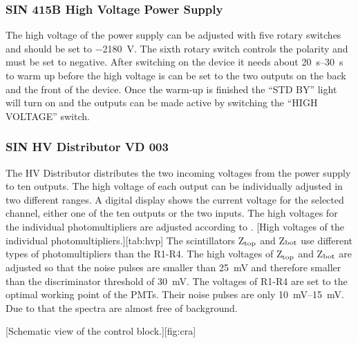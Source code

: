 \subsubsection*{SIN 415B High Voltage Power Supply}
The high voltage of the power supply can be adjusted with five rotary switches and should be set to \SI{-2180}{\volt}. The sixth rotary switch controls the polarity and must be set to negative. After switching on the device it needs about \SIrange{20}{30}{\second} to warm up before the high voltage is can be set to the two outputs on the back and the front of the device. Once the warm-up is finished the ``STD BY'' light will turn on and the outputs can be made active by switching the ``HIGH VOLTAGE'' switch.
\subsubsection*{SIN HV Distributor VD 003}
The HV Distributor distributes the two incoming voltages from the power supply to ten outputs. The high voltage of each output can be individually adjusted in two different ranges. A digital display shows the current voltage for the selected channel, either one of the ten outputs or the two inputs. The high voltages for the individual photomultipliers are adjusted according to .
[High voltages of the individual photomultipliers.][tab:hvp]
The scintillators Z$_{\text{top}}$ and Z$_{\text{bot}}$ use different types of photomultipliers than the R1-R4. The high voltages of Z$_{\text{top}}$ and Z$_{\text{bot}}$ are adjusted so that the noise pulses are smaller than \SI{25}{\milli\volt} and therefore smaller than the discriminator threshold of \SI{30}{\milli\volt}. The voltages of R1-R4 are set to the optimal working point of the \acp{PMT}. Their noise pulses are only \SIrange{10}{15}{\milli\volt}. Due to that the spectra are almost free of background. 


[Schematic view of the control block.][fig:cra]






